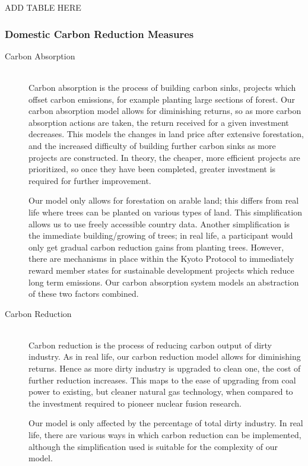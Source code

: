 \begin{center}
ADD TABLE HERE
\end{center}

\subsubsection{Domestic Carbon Reduction Measures}

\begin{description}
\item [Carbon Absorption] \hfill \\ 
Carbon absorption is the process of building carbon sinks, projects which offset carbon emissions, for example planting large sections of forest. Our carbon absorption model allows for diminishing returns, so as more carbon absorption actions are taken, the return received for a given investment decreases. This models the changes in land price after extensive forestation, and the increased difficulty of building further carbon sinks as more projects are constructed. In theory, the cheaper, more efficient projects are prioritized, so once they have been completed, greater investment is required for further improvement.

Our model only allows for forestation on arable land; this differs from real life where trees can be planted on various types of land. This simplification allows us to use freely accessible country data. Another simplification is the immediate building/growing of trees; in real life, a participant would only get gradual carbon reduction gains from planting trees. However, there are mechanisms in place within the Kyoto Protocol to immediately reward member states for sustainable development projects which reduce long term emissions. Our carbon absorption system models an abstraction of these two factors combined. 

\item [Carbon Reduction] \hfill \\ 
Carbon reduction is the process of reducing carbon output of dirty industry. As in real life, our carbon reduction model allows for diminishing returns. Hence as more dirty industry is upgraded to clean one, the cost of further reduction increases. This maps to the ease of upgrading from coal power to existing, but cleaner natural gas technology, when compared to the investment required to pioneer nuclear fusion research.

Our model is only affected by the percentage of total dirty industry. In real life, there are various ways in which carbon reduction can be implemented, although the simplification used is suitable for the complexity of our model.


\end{description}
